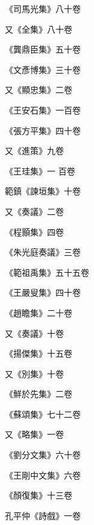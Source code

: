 \begin{pinyinscope}
 《司馬光集》八十卷



 又《全集》八十卷



 《龔鼎臣集》五十卷



 《文彥博集》三十卷



 又《顯忠集》二卷



 《王安石集》一百卷



 《張方平集》四十卷



 又《進策》九卷



 《王珪集》一
 百卷



 範鎮《諫垣集》十卷



 又《奏議》二卷



 《程顥集》四卷



 《朱光庭奏議》三卷



 《範祖禹集》五十五卷



 《王嚴叟集》四十卷



 《趙瞻集》二十卷



 又《奏議》十卷



 《揚傑集》十五卷



 又《別集》十卷



 《鮮於先集》二卷



 《蘇頌集》七十二卷



 又《略集》一卷



 《劉分文集》六十卷



 《王剛中文集》六卷



 《顏復集》十三卷



 孔平仲《詩戲》一卷




\end{pinyinscope}
